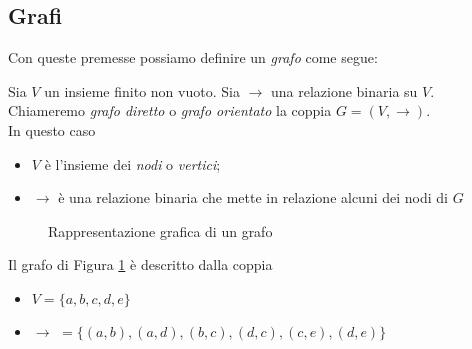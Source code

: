 \subsection{Grafi}
Con queste premesse possiamo definire un \emph{grafo} come segue:
\begin{definition}
    Sia $V$ un insieme finito non vuoto. Sia $\to$ una relazione binaria su $V$.\\
    Chiameremo \emph{grafo diretto} o \emph{grafo orientato} la coppia $G = (V, \to)$.\\
    In questo caso
    \begin{itemize}
        \item $V$ è l'insieme dei \emph{nodi} o \emph{vertici};
        \item $\to$ è una relazione binaria che mette in relazione alcuni dei nodi di $G$
    \end{itemize}
\end{definition}
\begin{example}
    \begin{figure}[b]
        \centering
        \caption{Rappresentazione grafica di un grafo}
        \label{fig:graph}
    \end{figure}
    Il grafo di Figura \ref{fig:graph} è descritto dalla coppia
    \begin{itemize}
        \item $V = \{a,b,c,d,e\}$
        \item $\to \,\,= \{(a,b), (a,d), (b,c), (d,c), (c,e), (d,e)\}$
    \end{itemize}
\end{example}
